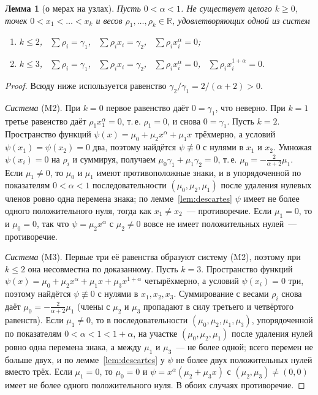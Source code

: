 \documentclass[11pt,a4paper]{article}
\theoremstyle{plain}
\newtheorem{lemma}{Лемма}
\theoremstyle{definition}
\begin{document}
\begin{lemma}[о мерах на узлах]\label{lem:measures}
Пусть $0<\alpha<1$. Не существует целого $k\ge0$, точек $0<x_1<\dots<x_k$ и весов $\rho_1,\dots,\rho_k\in\mathbb R$, удовлетворяющих одной из систем
\begin{enumerate}
\item[(M2)] $k\le2$, \ $\sum\rho_i=\gamma_1$, \ $\sum\rho_ix_i=\gamma_2$, \ $\sum\rho_ix_i^{\alpha}=0$;
\item[(M3)] $k\le3$, \ $\sum\rho_i=\gamma_1$, \ $\sum\rho_ix_i=\gamma_2$, \ $\sum\rho_ix_i^{\alpha}=0$, \ $\sum\rho_ix_i^{1+\alpha}=0$.
\end{enumerate}
\end{lemma}
\begin{proof}
Всюду ниже используется равенство $\gamma_2/\gamma_1=2/(\alpha+2)>0$.

\emph{Система} (M2). При $k=0$ первое равенство даёт $0=\gamma_1$, что неверно. При $k=1$ третье равенство даёт $\rho_1x_1^{\alpha}=0$, т.\,е. $\rho_1=0$, и снова $0=\gamma_1$. Пусть $k=2$. Пространство функций $\psi(x)=\mu_0+\mu_2x^{\alpha}+\mu_1x$ трёхмерно, а условий $\psi(x_1)=\psi(x_2)=0$ два, поэтому найдётся $\psi\not\equiv0$ с нулями в $x_1$ и $x_2$. Умножая $\psi(x_i)=0$ на $\rho_i$ и суммируя, получаем $\mu_0\gamma_1+\mu_1\gamma_2=0$, т.\,е. $\mu_0=-\frac{2}{\alpha+2}\mu_1$. Если $\mu_1\ne0$, то $\mu_0$ и $\mu_1$ имеют противоположные знаки, и в упорядоченной по показателям $0<\alpha<1$ последовательности $(\mu_0,\mu_2,\mu_1)$ после удаления нулевых членов ровно одна перемена знака; по лемме~\ref{lem:descartes} $\psi$ имеет не более одного положительного нуля, тогда как $x_1\ne x_2$~--- противоречие. Если $\mu_1=0$, то и $\mu_0=0$, так что $\psi=\mu_2x^{\alpha}$ с $\mu_2\ne0$ вовсе не имеет положительных нулей~--- противоречие.

\emph{Система} (M3). Первые три её равенства образуют систему (M2), поэтому при $k\le2$ она несовместна по доказанному. Пусть $k=3$. Пространство функций $\psi(x)=\mu_0+\mu_2x^{\alpha}+\mu_1x+\mu_3x^{1+\alpha}$ четырёхмерно, а условий $\psi(x_i)=0$ три, поэтому найдётся $\psi\not\equiv0$ с нулями в $x_1,x_2,x_3$. Суммирование с весами $\rho_i$ снова даёт $\mu_0=-\frac{2}{\alpha+2}\mu_1$ (члены с $\mu_2$ и $\mu_3$ пропадают в силу третьего и четвёртого равенств). Если $\mu_1\ne0$, то в последовательности $(\mu_0,\mu_2,\mu_1,\mu_3)$, упорядоченной по показателям $0<\alpha<1<1+\alpha$, на участке $(\mu_0,\mu_2,\mu_1)$ после удаления нулей ровно одна перемена знака, а между $\mu_1$ и $\mu_3$~--- не более одной; всего перемен не больше двух, и по лемме~\ref{lem:descartes} у $\psi$ не более двух положительных нулей вместо трёх. Если $\mu_1=0$, то $\mu_0=0$ и $\psi=x^{\alpha}(\mu_2+\mu_3x)$ с $(\mu_2,\mu_3)\ne(0,0)$ имеет не более одного положительного нуля. В обоих случаях противоречие.
\end{proof}
\end{document}
